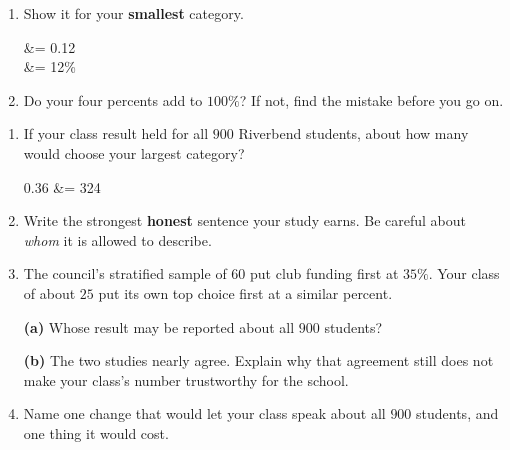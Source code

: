 \documentclass[10pt]{article}
\begin{document}
\begin{tcolorbox}
\begin{enumerate}[leftmargin=1.6em, itemsep=3pt, topsep=3pt]
  \item Show it for your \textbf{smallest} category.

        \begin{work}
           &= 0.12 \\
                        &= 12\%
        \end{work}

  \item Do your four percents add to $100\%$? If not, find the mistake before
        you go on. 

\end{enumerate}
\end{tcolorbox}

\vspace{0.03in}

\boxguard
\begin{tcolorbox}[colback=white, colframe=black!40, breakable,
    title=\textbf{Tier E --- Extension: Report It, Then Judge It},
    fonttitle=\bfseries, arc=2mm, left=3mm, right=3mm, top=1.5mm, bottom=1.5mm]
\small
\begin{enumerate}[leftmargin=1.6em, itemsep=4pt, topsep=3pt]

  \item If your class result held for all $900$ Riverbend students, about how
        many would choose your largest category?

        \begin{work}
          0.36  &= 324 
        \end{work}

  \item Write the strongest \textbf{honest} sentence your study earns. Be
        careful about \emph{whom} it is allowed to describe.

  \item The council's stratified sample of $60$ put club funding first at
        $35\%$. Your class of about $25$ put its own top choice first at a
        similar percent.

        \textbf{(a)} Whose result may be reported about all $900$ students?

        \textbf{(b)} The two studies nearly agree. Explain why that agreement
        still does not make your class's number trustworthy for the school.

  \item Name one change that would let your class speak about all $900$
        students, and one thing it would cost. 

\end{enumerate}
\end{tcolorbox}
\end{document}
